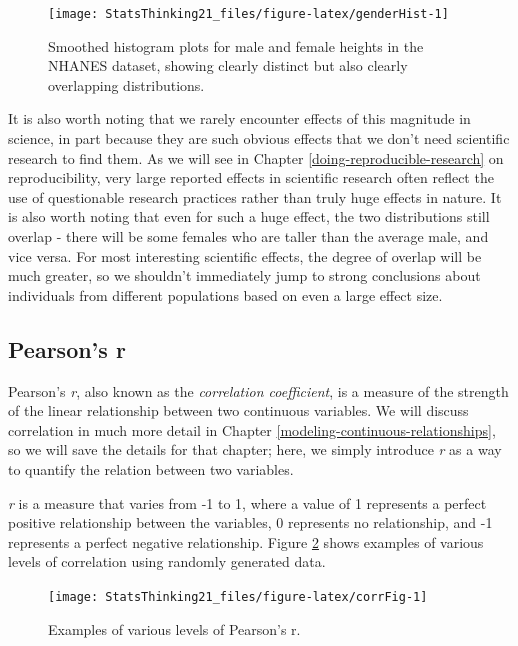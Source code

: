 \documentclass[12pt,]{book}
\theoremstyle{definition}
\theoremstyle{definition}
\theoremstyle{definition}
\theoremstyle{remark}
\begin{document}
\begin{figure}
\texttt{[image: StatsThinking21\_files/figure-latex/genderHist-1]} \caption{Smoothed histogram plots for male and female heights in the NHANES dataset, showing clearly distinct but also clearly overlapping distributions.}\label{fig:genderHist}
\end{figure}

It is also worth noting that we rarely encounter effects of this magnitude in science, in part because they are such obvious effects that we don't need scientific research to find them. As we will see in Chapter \ref{doing-reproducible-research} on reproducibility, very large reported effects in scientific research often reflect the use of questionable research practices rather than truly huge effects in nature. It is also worth noting that even for such a huge effect, the two distributions still overlap - there will be some females who are taller than the average male, and vice versa. For most interesting scientific effects, the degree of overlap will be much greater, so we shouldn't immediately jump to strong conclusions about individuals from different populations based on even a large effect size.

\hypertarget{pearsons-r}{%
\subsection{Pearson's r}\label{pearsons-r}}

Pearson's \emph{r}, also known as the \emph{correlation coefficient}, is a measure of the strength of the linear relationship between two continuous variables. We will discuss correlation in much more detail in Chapter \ref{modeling-continuous-relationships}, so we will save the details for that chapter; here, we simply introduce \emph{r} as a way to quantify the relation between two variables.

\emph{r} is a measure that varies from -1 to 1, where a value of 1 represents a perfect positive relationship between the variables, 0 represents no relationship, and -1 represents a perfect negative relationship. Figure \ref{fig:corrFig} shows examples of various levels of correlation using randomly generated data.

\begin{figure}
\texttt{[image: StatsThinking21\_files/figure-latex/corrFig-1]} \caption{Examples of various levels of Pearson's r.}\label{fig:corrFig}
\end{figure}
\end{document}
